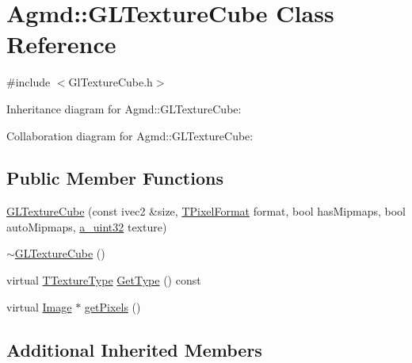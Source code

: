 \hypertarget{class_agmd_1_1_g_l_texture_cube}{\section{Agmd\+:\+:G\+L\+Texture\+Cube Class Reference}
\label{class_agmd_1_1_g_l_texture_cube}
}


{\ttfamily \#include $<$Gl\+Texture\+Cube.\+h$>$}



Inheritance diagram for Agmd\+:\+:G\+L\+Texture\+Cube\+:


Collaboration diagram for Agmd\+:\+:G\+L\+Texture\+Cube\+:
\subsection*{Public Member Functions}
\begin{DoxyCompactItemize}
\item 
\hyperlink{class_agmd_1_1_g_l_texture_cube_a7abdec6655f67911cfa5ef51c2e79c4e}{G\+L\+Texture\+Cube} (const ivec2 \&size, \hyperlink{namespace_agmd_afc48fd9fa5dccb4c5621c052bfd1a7ec}{T\+Pixel\+Format} format, bool has\+Mipmaps, bool auto\+Mipmaps, \hyperlink{_common_defines_8h_a964296f9770051b9e4807b1f180dd416}{a\+\_\+uint32} texture)
\item 
\hyperlink{class_agmd_1_1_g_l_texture_cube_ab2af9fc617826d9bcfd7e21a1061989a}{$\sim$\+G\+L\+Texture\+Cube} ()
\item 
virtual \hyperlink{namespace_agmd_a7036bece09449a930cfec410f75e85f4}{T\+Texture\+Type} \hyperlink{class_agmd_1_1_g_l_texture_cube_ad159f601e39b7a31b24b971680134375}{Get\+Type} () const 
\item 
virtual \hyperlink{class_agmd_1_1_image}{Image} $\ast$ \hyperlink{class_agmd_1_1_g_l_texture_cube_aa1a1ef3de3f5acdf74335abef75d5747}{get\+Pixels} ()
\end{DoxyCompactItemize}
\subsection*{Additional Inherited Members}


